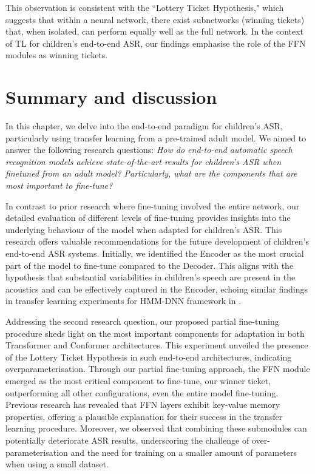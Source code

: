 This observation is consistent with the ``Lottery Ticket Hypothesis," which suggests that within a neural network, there exist subnetworks (winning tickets) that, when isolated, can perform equally well as the full network. In the context of \ac{TL} for children's end-to-end \ac{ASR}, our findings emphasise the role of the \ac{FFN} modules as winning tickets.

\section{Summary and discussion}

In this chapter, we delve into the end-to-end paradigm for children's \ac{ASR}, particularly using transfer learning from a pre-trained adult model. We aimed to answer the following research questions: \textit{How do end-to-end automatic speech recognition models achieve state-of-the-art results for children's ASR when finetuned from an adult model? Particularly, what are the components that are most important to fine-tune?}

In contrast to prior research where fine-tuning involved the entire network, our detailed evaluation of different levels of fine-tuning provides insights into the underlying behaviour of the model when adapted for children's \ac{ASR}. This research offers valuable recommendations for the future development of children's end-to-end \ac{ASR} systems. Initially, we identified the Encoder as the most crucial part of the model to fine-tune compared to the Decoder. This aligns with the hypothesis that substantial variabilities in children's speech are present in the acoustics and can be effectively captured in the Encoder, echoing similar findings in transfer learning experiments for \ac{HMM-DNN} framework in \cite{TFchildren}.

Addressing the second research question, our proposed partial fine-tuning procedure sheds light on the most important components for adaptation in both Transformer and Conformer architectures. This experiment unveiled the presence of the Lottery Ticket Hypothesis in such end-to-end architectures, indicating overparameterisation. Through our partial fine-tuning approach, the \ac{FFN} module emerged as the most critical component to fine-tune, our winner ticket, outperforming all other configurations, even the entire model fine-tuning. Previous research \cite{geva2020transformer} has revealed that \ac{FFN} layers exhibit key-value memory properties, offering a plausible explanation for their success in the transfer learning procedure. Moreover, we observed that combining these submodules can potentially deteriorate \ac{ASR} results, underscoring the challenge of over-parameterisation and the need for training on a smaller amount of parameters when using a small dataset. 

